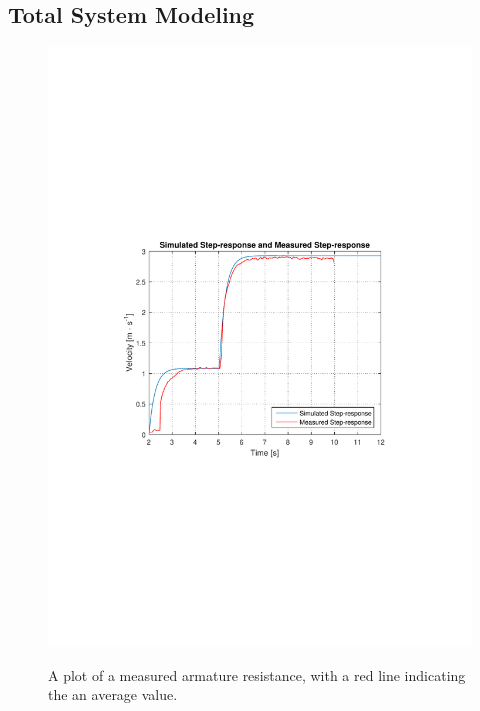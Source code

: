 \subsection{Total System Modeling}


\begin{figure}[H]
  \centering
  {
    \includegraphics[width=1.2\textwidth]{figures/VelocityStepResponseIRLandSimulation.pdf}
  }
  \caption{A plot of a measured armature resistance, with a red line indicating the an average value.}
  \label{armatureResistance}
\end{figure}

